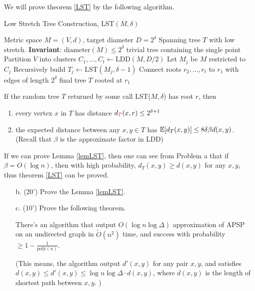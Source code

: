 We will prove theorem \ref{LST} by the following algorithm. 

\begin{algorithm}[H]
\caption{Low Stretch Tree Construction, LST$(M, \delta)$}
\label{alg:lst}
\begin{algorithmic}[1]
\Require Metric space $M=(V,d)$, target diameter $D=2^\delta$
\Ensure Spanning tree $T$ with low stretch.  \textbf{Invariant}: $\mathrm{diameter}(M) \leq 2^\delta$
    \State \Return trivial tree containing the single point
\EndIf
\State Partition $V$ into clusters $C_1,\dots,C_t \gets \mathrm{LDD}(M, D/2)$ 
    \State Let $M_j$ be $M$ restricted to $C_j$
    \State Recursively build $T_j \gets \mathrm{LST}(M_j, \delta-1)$
\EndFor
\State Connect roots $r_2,\dots,r_t$ to $r_1$ with edges of length $2^\delta$
\State \Return final tree $T$ rooted at $r_1$
\end{algorithmic}
\end{algorithm}

\begin{lemma}\label{lemLST}
    If the random tree $T$ returned by some call LST($M, \delta$) has root $r$, then 
    \begin{enumerate}
        \item every vertex $x$ in $T$ has distance $d_{\textcolor{red}{T}}(x, r) \le 2 ^ {\delta + 1}$
        \item the expected distance between any $x, y\in T$ has $\operatorname*{\mathbb{E}}[d_T(x, y)] \le 8 \delta \beta d(x, y)$. (Recall that $\beta$ is the approximate factor in LDD) 
    \end{enumerate}
\end{lemma}

If we can prove Lemma \ref{lemLST}, then one can see from Problem a that if $\beta = O(\log n)$, then with high probability, $d_T(x, y) \ge d(x, y)$ for any $x, y$, thus theorem \ref{LST} can be proved. 


    \begin{itemize}
        \item [b. (20')] Prove the Lemma \ref{lemLST}. 
    \end{itemize}


    
    \begin{itemize}
        \item [c. (10')] Prove the following theorem. 

        \begin{theorem}
            There's an algorithm that output $O(\log n\log \Delta)$ approximation of APSP on an undirected graph in $\tilde{O}(n ^ 2)$ time, and success with probability $\ge 1 - \frac 1{\text{poly}(n)}$.
        \end{theorem}


        (This means, the algorithm output $d'(x, y)$ for any pair $x, y$, and satisfies $d(x, y) \le d'(x, y) \le \log n\log \Delta \cdot d(x, y)$, where $d(x, y)$ is the length of shortest path between $x, y$. )
    \end{itemize}


